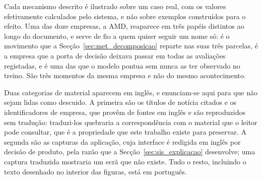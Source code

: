Cada mecanismo descrito é ilustrado sobre um caso real, com os valores efetivamente calculados
pelo sistema, e não sobre exemplos construídos para o efeito. Uma das doze empresas, a AMD,
reaparece em três papéis distintos ao longo do documento, e serve de fio a quem quiser seguir
um nome só: é o movimento que a Secção~\ref{sec:met_decomposicao} reparte nas suas três
parcelas, é a empresa que a porta de decisão deixava passar em todas as avaliações
registadas, e é uma das que o modelo pontua sem nunca as ter observado no treino. São três
momentos da mesma empresa e não do mesmo acontecimento.

Duas categorias de material aparecem em inglês, e enunciam-se aqui para que não sejam lidas
como descuido. A primeira são os títulos de notícia citados e os identificadores de empresa,
que provêm de fontes em inglês e são reproduzidos sem tradução: traduzi-los quebraria a
correspondência com o material que o leitor pode consultar, que é a propriedade que este
trabalho existe para preservar. A segunda são as capturas da aplicação, cuja interface é
redigida em inglês por decisão de produto, pela razão que a Secção~\ref{sec:sis_explicacao}
desenvolve; uma captura traduzida mostraria um ecrã que não existe. Tudo o resto, incluindo o
texto desenhado no interior das figuras, está em português.
